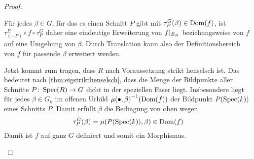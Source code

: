 \begin{Lemma}
\begin{proof}
\begin{description}
      Für jedes $\beta\in G$, für das es einen Schnitt $P$ gibt mit
      ${\tau_P^G(\beta)\in\operatorname{Dom}(f)}$, ist ${\tau_{(-P)}^E\circ f\circ
      \tau_P^G}$ daher eine eindeutige Erweiterung von $f|_{E_{K}}$
      beziehungsweise von $f$ auf eine Umgebung von $\beta$.
      Durch Translation kann also der Definitionsbereich von $f$ für
      passende $\beta$ erweitert werden. 

      Jetzt kommt zum tragen, dass $R$ nach Voraussetzung strikt
      henselsch ist. Das bedeutet nach
      \ref{thm:eigstrikthenselsch}, dass die Menge der Bildpunkte
      aller Schnitte ${P\colon\operatorname{Spec}(R)\to G}$ dicht in der
      speziellen Faser liegt.
      Insbesondere liegt für jedes $\beta\in G_k$ im offenen Urbild
      ${\mu(\bullet,\beta)}^{-1}(\operatorname{Dom}(f))$ der Bildpunkt $P(\operatorname{Spec}(k))$
      eines Schnitts $P$. Damit erfüllt $\beta$ die Bedingung von oben
      wegen
      \begin{gather*}
        \tau_P^G(\beta)=\mu(P(\operatorname{Spec}(k)),\beta)\in\operatorname{Dom}(f)
      \end{gather*}
      Damit ist $f$ auf ganz $G$ definiert und somit ein Morphismus.
      \qedhere
    \end{description}
  \end{proof}
\end{Lemma}


